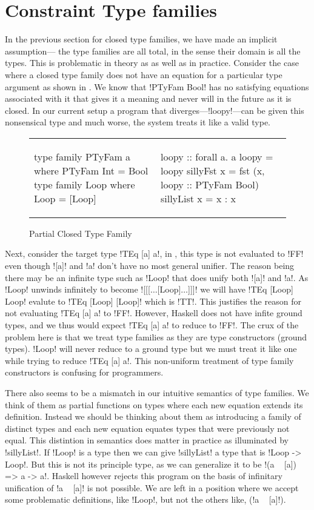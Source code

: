 \documentclass[format=sigplan,manuscript,review,screen,nonacm,margin=1in]{acmart}
\begin{document}
\section{Constraint Type families}\label{sec:tf-constrained}
In the previous section for closed type families, we have made an implicit assumption---
the type families are all total, in the sense their domain is all the types.
This is problematic in theory as as well as in practice.
Consider the case where a closed type family does not have an equation for a particular type argument
as shown in . We know that !PTyFam Bool!
has no satisfying equations associated with it that gives it a meaning and never will in the future
as it is closed. In our current setup a program that diverges---!loopy!---can be given
this nonsensical type and much worse, the system treats it like a valid type.
\begin{figure}[ht]
  \begin{tabular}{l l}
\begin{code}
type family PTyFam a where
  PTyFam Int = Bool
type family Loop where
  Loop = [Loop]
\end{code}&%
\begin{code}
loopy :: forall a. a
loopy = loopy
sillyFst x = fst (x, loopy :: PTyFam Bool)
sillyList x = x : x
\end{code}
  \end{tabular}
  \caption{Partial Closed Type Family}
  \label{fig:incomplete-tyfam}
\end{figure}

Next, consider the target type !TEq [a] a!, in \CLTF, this type is not evaluated to
!FF! even though ![a]! and !a! don't have no most general unifier. The reason being there
may be an infinite type such as !Loop! that does unify both ![a]! and !a!. As
!Loop! unwinds infinitely to become ![[[$\ldots$[Loop]$\ldots$]]]! we will have
!TEq [Loop] Loop! evalute to !TEq [Loop] [Loop]! which is !TT!. This justifies the
reason for not evaluating !TEq [a] a! to !FF!. However, Haskell does not have infite ground types,
and we thus would expect !TEq [a] a! to reduce to !FF!.
The crux of the problem here is that we treat type families as they are type constructors (ground types).
!Loop! will never reduce to a ground type but we must treat it like one while trying to reduce !TEq [a] a!.
This non-uniform treatment of type family constructors is confusing for programmers.

There also seems to be a mismatch in our intuitive semantics of type families. We think
of them as partial functions on types where each new equation extends its definition. Instead
we should be thinking about them as introducing a family of distinct types and
each new equation equates types that were previously not equal. This distintion in semantics
does matter in practice as illuminated by !sillyList!. If !Loop! is a type then we
can give !sillyList! a type that is !Loop -> Loop!. But this is not its principle type,
as we can generalize it to be  !(a ~ [a]) => a -> a!. Haskell however rejects this program
on the basis of infinitary unification of !a ~ [a]! is not possible. We are left in a position
where we accept some problematic definitions, like !Loop!, but not the others like, (!a ~ [a]!).
\end{document}

